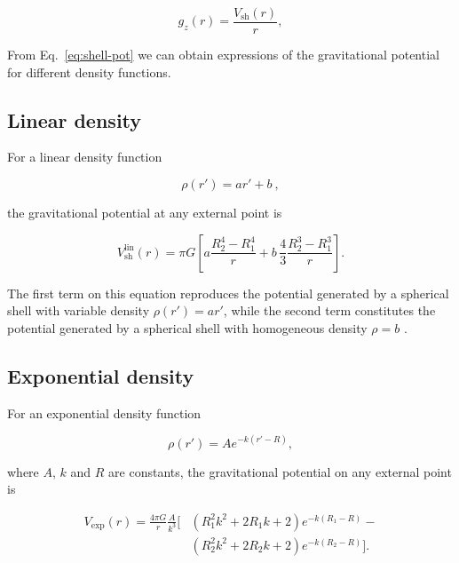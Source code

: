 \documentclass[extra, referee]{gji}
\begin{document}
\begin{equation}
    g_z(r) = \frac{V_\text{sh}(r)}{r},
\end{equation}

From Eq.~\ref{eq:shell-pot} we can obtain expressions of the gravitational potential for
different density functions.

\subsection{Linear density}

For a linear density function

\begin{equation}
    \rho(r') = ar' + b\ ,
\end{equation}

\noindent
the gravitational potential at any external point is

\begin{equation}
    V_\text{sh}^\text{lin}(r) = \pi G \left[
    a \frac{R_2^4 - R_1^4}{r} +
    b \,\frac{4}{3} \frac{R_2^3 - R_1^3}{r} \right].
    \label{eq:shell-pot-linear}
\end{equation}

\noindent The first term on this equation reproduces the potential generated
by a spherical shell with variable density $\rho(r') = ar'$, while the second
term constitutes the potential generated by a spherical shell with homogeneous
density $\rho = b$ \citep{Mikuska2006,Grombein2013}.

\subsection{Exponential density}

For an exponential density function

\begin{equation}
    \rho(r') = A e^{- k (r' - R)},
\end{equation}

\noindent
where $A$, $k$ and $R$ are constants, the gravitational potential on any external point
is

\begin{equation}
    \begin{split}
    V_\text{exp}(r) = \frac{4\pi G}{r} \frac{A}{k^3} \Big[
    & \left( R_1^2 k^2 + 2 R_1 k + 2 \right) e^{- k (R_1 - R)} - \\
    & \left( R_2^2 k^2 + 2 R_2 k + 2 \right) e^{- k (R_2 - R)}
    \Big].
    \end{split}
\end{equation}
\end{document}
